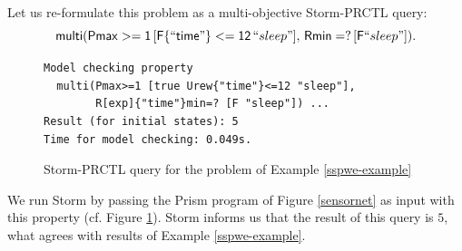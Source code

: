 \begin{example}
\[  \]
  Let us re-formulate this problem as a multi-objective Storm-PRCTL query:
  \[
    \mathsf{multi(Pmax>=1\, [F\{``time"\}<=12 } \,``sleep"\mathsf{], \, Rmin=? \, [F }``sleep"\mathsf{])}.
  \]
  \begin{figure}[h!]
  {
  \footnotesize
  \begin{verbatim}
Model checking property
  multi(Pmax>=1 [true Urew{"time"}<=12 "sleep"],
        R[exp]{"time"}min=? [F "sleep"]) ...
Result (for initial states): 5
Time for model checking: 0.049s.
  \end{verbatim}
  }
    \vspace{-2em}
    \caption{Storm-PRCTL query for the \SSPWE{} problem of Example \ref{sspwe-example}}
    \label{sspwe-program}
  \end{figure}
We run Storm by passing the Prism program of Figure \ref{sensornet} as input with this property (cf. Figure \ref{sspwe-program}).
Storm informs us that the result of this query is $5$, what agrees with results of Example \ref{sspwe-example}.
\end{example}


